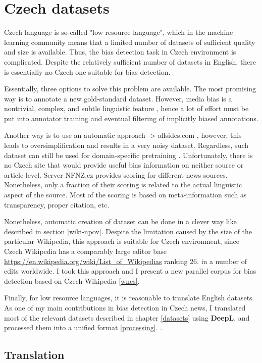 \chapter{Czech datasets}
Czech language is so-called "low resource language", which in the machine learning community means that a limited number of datasets of sufficient quality and size is available. Thus, the bias detection task in Czech environment is complicated. Despite the relatively sufficient number of datasets in English, there is essentially no Czech one suitable for bias detection.

 Essentially, three options to solve this problem are available. The most promising way is to annotate a new gold-standard dataset. However, media bias is a nontrivial, complex, and subtle linguistic feature , hence a lot of effort must be put into annotator training and eventual filtering of implicitly biased annotations.
 
 Another way is to use an automatic approach -> allsides.com , however, this leads to oversimplification and results in a very noisy dataset. Regardless, such dataset can still be used for domain-specific pretraining \cite{Spinde2021f}. Unfortunately, there is no Czech site that would provide useful bias information on neither source or article level. Server NFNZ.cz provides scoring for different news sources. Nonetheless, only a fraction of their scoring is related to the actual linguistic aspect of the source. Most of the scoring is based on meta-information such as transparency, proper citation, etc.
 
 Nonetheless, automatic creation of dataset can be done in a clever way like described in section \ref{wiki-npov}. Despite the limitation caused by the size of the particular Wikipedia, this approach is suitable for Czech environment, since Czech Wikipedia has a comparably large editor base \url{https://en.wikipedia.org/wiki/List_of_Wikipedias} ranking 26. in a number of edits worldwide. I took this approach and I present a new parallel corpus for bias detection based on Czech Wikipedia \ref{wncs}.
 
 Finally, for low resource languages, it is reasonable to translate English datasets. As one of my main contributions in bias detection in Czech news, I translated most of the relevant datasets described in chapter \ref{datasets} using \textbf{DeepL}, and processed them into a unified format \ref{processing}. .
 
\section{Translation}

